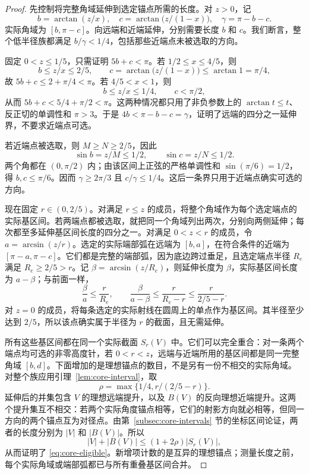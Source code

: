 \begin{proof}
先控制将完整角域延伸到选定锚点所需的长度。对 $z>0$，记
\[
 b=\arctan(z/x),\quad c=\arctan\bigl(z/(1-x)\bigr),\quad
 \gamma=\pi-b-c.
\]
实际角域为 $[b,\pi-c]$。向远端和近端延伸，分别需要长度 $b$ 和 $c$。我们断言，整个低半径族都满足 $b/\gamma<1/4$，包括那些近端点未被选取的方向。

固定 $0<z\leq1/5$，只需证明 $5b+c<\pi$。若 $1/2\leq x\leq4/5$，则
\[
 b\leq z/x\leq2/5,\qquad
 c=\arctan\bigl(z/(1-x)\bigr)\leq\arctan1=\pi/4,
\]
故 $5b+c\leq2+\pi/4<\pi$。若 $4/5<x<1$，则
\[
 b\leq z/x\leq1/4,\qquad c<\pi/2,
\]
从而 $5b+c<5/4+\pi/2<\pi$。这两种情况都只用了非负参数上的 $\arctan t\leq t$、反正切的单调性和 $\pi>3$。于是 $4b<\pi-b-c=\gamma$，证明了远端的四分之一延伸界，不要求近端点可选。

若近端点被选取，则 $M\geq N\geq2/5$，因此
\[
 \sin b=z/M\leq1/2,\qquad \sin c=z/N\leq1/2.
\]
两个角都在 $(0,\pi/2)$ 内；由该区间上正弦的严格单调性和 $\sin(\pi/6)=1/2$，得 $b,c\leq\pi/6$。因而 $\gamma\geq2\pi/3$ 且 $c/\gamma\leq1/4$。这后一条界只用于近端点确实可选的方向。

现在固定 $r\in(0,2/5)$。对满足 $r\leq z$ 的成员，将整个角域作为每个选定端点的实际基区间。若两端点都被选取，就把同一个角域列出两次，分别向两侧延伸；每次都至多延伸基区间长度的四分之一。对满足 $0<z<r$ 的成员，令 $a=\arcsin(z/r)$。选定的实际端部弧在远端为 $[b,a]$，在符合条件的近端为 $[\pi-a,\pi-c]$。它们都是完整的端部弧，因为底边跨过垂足，且选定端点半径 $R_e$ 满足 $R_e\geq2/5>r$。记 $\beta=\arcsin(z/R_e)$，则延伸长度为 $\beta$，实际基区间长度为 $a-\beta$；与前面一样，
\[
 \frac{\beta}{a}\leq\frac r{R_e},\qquad
 \frac{\beta}{a-\beta}\leq\frac r{R_e-r}
                                  \leq\frac r{2/5-r}.
\]
对 $z=0$ 的成员，将每条选定的实际射线在圆周上的单点作为基区间。其半径至少达到 $2/5$，所以该点确实属于半径为 $r$ 的截面，且无需延伸。

所有这些基区间都在同一个实际截面 $S_r(V)$ 中。它们可以完全重合：对一条两个端点均可选的非零高度针，若 $0<r<z$，远端与近端所用的基区间都是同一完整角域 $[b,d]$。下面增加的是理想锚点的数目，不是另有一份不相交的实际角域。对整个族应用引理~\ref{lem:core-interval}，取
\[
                    \rho=\max\{1/4,r/(2/5-r)\}.
\]
延伸后的并集包含 $V$ 的理想远端提升，以及 $B(V)$ 的反向理想近端提升。这两个提升集互不相交：若两个实际角度锚点相等，它们的射影方向就必相等，但同一方向的两个锚点互为对径点。由第~\ref{subsec:core-intervals} 节的坐标区间论证，两者的长度分别为 $|V|$ 和 $|B(V)|$。所以
\[
           |V|+|B(V)|\leq(1+2\rho)|S_r(V)|,
\]
从而证明了 \eqref{eq:core-eligible}。新增项计数的是互异的理想锚点；测量长度之前，每个实际角域或端部弧都已与所有重叠基区间合并。
\end{proof}

